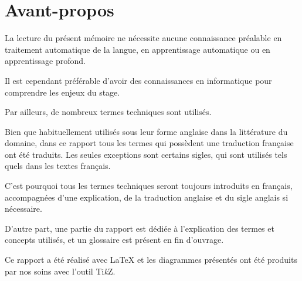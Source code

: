 \section*{Avant-propos} %
La lecture du présent mémoire ne nécessite aucune connaissance préalable en traitement automatique de la langue, en apprentissage automatique ou en apprentissage profond.

Il est cependant préférable d'avoir des connaissances en informatique pour comprendre les enjeux du stage.

Par ailleurs, de nombreux termes techniques sont utilisés.

Bien que habituellement utilisés sous leur forme anglaise dans la littérature du domaine, dans ce rapport tous les termes qui possèdent une traduction française ont été traduits.
Les seules exceptions sont certains sigles, qui sont utilisés tels quels dans les textes français.

C'est pourquoi tous les termes techniques seront toujours introduits en français, accompagnées d'une explication, de la traduction anglaise et du sigle anglais si nécessaire.


D'autre part, une partie du rapport est dédiée à l'explication des termes et concepts utilisés, et un glossaire est présent en fin d'ouvrage.



Ce rapport a été réalisé avec \LaTeX{} et les diagrammes présentés ont été produits par nos soins avec l'outil Ti\textit{k}Z.